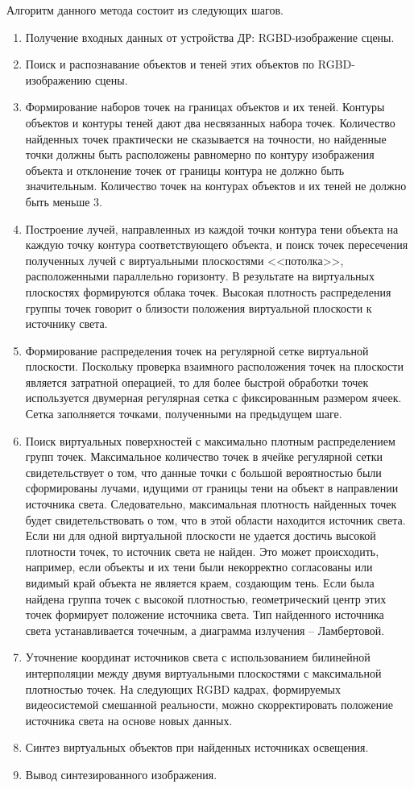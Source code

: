 Алгоритм данного метода состоит из следующих шагов.
\begin{enumerate}
	\item Получение входных данных от устройства ДР: RGBD-изображение сцены.
	\item Поиск и распознавание объектов и теней этих объектов по RGBD-изображению сцены.
	\item Формирование наборов точек на границах объектов и их теней. Контуры объектов и контуры теней дают два несвязанных набора точек. Количество найденных точек практически не сказывается на точности, но найденные точки должны быть расположены равномерно по контуру изображения объекта и отклонение точек от границы контура не должно быть значительным. Количество точек на контурах объектов и их теней не должно быть меньше 3.
	\item Построение лучей, направленных из каждой точки контура тени объекта на каждую точку контура соответствующего объекта, и поиск точек пересечения полученных лучей с виртуальными плоскостями <<потолка>>, расположенными параллельно горизонту. В результате на виртуальных плоскостях формируются облака точек. Высокая плотность распределения группы точек говорит о близости положения виртуальной плоскости к источнику света.
	\item Формирование распределения точек на регулярной сетке виртуальной плоскости. Поскольку проверка взаимного расположения точек на плоскости является затратной операцией, то для более быстрой обработки точек используется двумерная регулярная сетка с фиксированным размером ячеек. Сетка заполняется точками, полученными на предыдущем шаге.
	\item Поиск виртуальных поверхностей с максимально плотным распределением групп точек. Максимальное количество точек в ячейке регулярной сетки свидетельствует о том, что данные точки с большой вероятностью были сформированы лучами, идущими от границы тени на объект в направлении источника света. Следовательно, максимальная плотность найденных точек будет свидетельствовать о том, что в этой области находится источник света. Если ни для одной виртуальной плоскости не удается достичь высокой плотности точек, то источник света не найден. Это может происходить, например, если объекты и их тени были некорректно согласованы или видимый край объекта не является краем, создающим тень. Если была найдена группа точек с высокой плотностью, геометрический центр этих точек формирует положение источника света. Тип найденного источника света устанавливается точечным, а диаграмма излучения -- Ламбертовой.
	\item Уточнение координат источников света с использованием билинейной интерполяции между двумя виртуальными плоскостями с максимальной плотностью точек. На следующих RGBD кадрах, формируемых видеосистемой смешанной реальности, можно скорректировать положение источника света на основе новых данных.
	\item Синтез виртуальных объектов при найденных источниках освещения.
	\item Вывод синтезированного изображения.
\end{enumerate}


